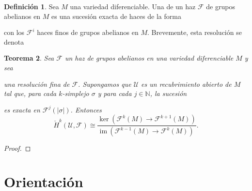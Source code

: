 \documentclass[12pt,a4paper]{book}
\newtheorem{thm}{Teorema}[section]
\theoremstyle{definition} \newtheorem{defn}[thm]{Definición}
\theoremstyle{definition} \newtheorem{ejemplo}[thm]{Ejemplo}
\theoremstyle{definition} \newtheorem{ejercicio}[thm]{Ejercicio}
\theoremstyle{remark} \newtheorem*{obs}{Observación}
\def\NN{\mathbb{N}}
\def\im{\mathrm{im}\ }
\def\FF{\mathscr{F}}
\let\emph\relax
\begin{document}
	  \begin{defn}
	    Sea $M$ una variedad diferenciable. Una \emph{resolución fina} de un haz $\FF$ de grupos abelianos en $M$ es una sucesión exacta de haces de la forma
	    \begin{center}
	    \end{center}
	    con los $\mathscr{F}^i$ haces finos de grupos abelianos en $M$. Brevemente, esta resolución se denota
	    \begin{center}
	    \end{center}
	  \end{defn}
	  \begin{thm}
	    Sea $\FF$ un haz de grupos abelianos en una variedad diferenciable $M$ y sea
	    \begin{center}
	    \end{center}
	    una resolución fina de $\FF$. Supongamos que $\mathcal{U}$ es un recubrimiento abierto de $M$ tal que, para cada $k$-simplejo $\sigma$ y para cada $j\in \NN$, la sucesión 
	    \begin{center}
	    \end{center}
	    es exacta en $\FF^j(|\sigma|)$. Entonces
	    \begin{equation*}
	      \check{H}^k(\mathcal{U},\FF)\cong \frac{\ker (\FF^k(M)\rightarrow \FF^{k+1}(M))}{\im (\FF^{k-1}(M) \rightarrow \FF^{k}(M))}.
	    \end{equation*}
	  \end{thm}
	  \begin{proof}
	    
	  \end{proof}
	  \chapter{Orientación}
\end{document}
